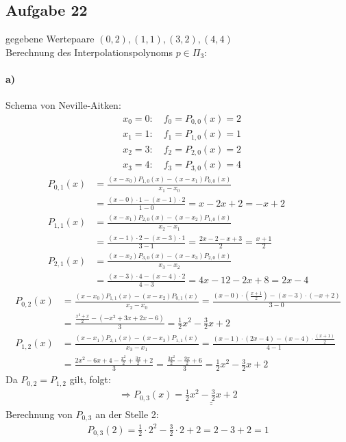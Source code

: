 \subsection*{Aufgabe 22}
gegebene Wertepaare $(0,2), (1,1), (3,2), (4,4)$\\
Berechnung des Interpolationspolynoms $p\in \Pi_3$:

\paragraph*{a)}
Schema von Neville-Aitken:
\begin{align*}
&x_0=0: \quad f_0=P_{0,0}(x)=2\\
&x_1=1: \quad f_1=P_{1,0}(x)=1\\
&x_2=3: \quad f_2=P_{2,0}(x)=2\\
&x_3=4: \quad f_3=P_{3,0}(x)=4
\end{align*}
\begin{align*}
P_{0,1}(x)&=\frac{(x-x_0)P_{1,0}(x)-(x-x_1)P_{0,0}(x)}{x_1-x_0}\\
  &=\frac{(x-0)\cdot 1 -(x-1)\cdot2}{1-0}= x-2x+2=-x+2\\
P_{1,1}(x)&=\frac{(x-x_1)P_{2,0}(x)-(x-x_2)P_{1,0}(x)}{x_2-x_1}\\
  &=\frac{(x-1)\cdot 2 -(x-3)\cdot 1}{3-1}= \frac{2x-2-x+3}{2}=\frac{x+1}{2}\\
P_{2,1}(x)&=\frac{(x-x_2)P_{3,0}(x)-(x-x_3)P_{2,0}(x)}{x_3-x_2}\\
  &=\frac{(x-3)\cdot 4 -(x-4)\cdot 2}{4-3}= 4x-12-2x+8=2x-4
\end{align*}
\begin{align*}
P_{0,2}(x)&=\frac{(x-x_0)P_{1,1}(x)-(x-x_2)P_{0,1}(x)}{x_2-x_0}=\frac{(x-0)\cdot (\frac{x+1}{2}) -(x-3) \cdot(-x+2)}{3-0}\\ &=\frac{\frac{x^2+x}{2}-(-x^2+3x+2x-6)}{3}=\frac{1}{2}x^2-\frac{3}{2}x+2\\
P_{1,2}(x)&=\frac{(x-x_1)P_{2,1}(x)-(x-x_3)P_{1,1}(x)}{x_3-x_1}=\frac{(x-1)\cdot (2x-4) -(x-4) \cdot\frac{(x+1)}{2}}{4-1}\\ &=\frac{2x^2-6x+4-\frac{x^2}{2}+\frac{3x}{2}+2}{3}=\frac{\frac{3x^2}{2}-\frac{9x}{2}+6}{3}=\frac{1}{2}x^2-\frac{3}{2}x+2
\end{align*}
Da $P_{0,2}=P_{1,2}$ gilt, folgt:
\begin{align*}
\Rightarrow P_{0,3}(x)=\underline{\underline{\frac{1}{2}x^2-\frac{3}{2}x+2}}
\end{align*}
Berechnung von $P_{0,3}$ an der Stelle 2:
\begin{align*}
P_{0,3}(2)=\frac{1}{2}\cdot 2^2-\frac{3}{2}\cdot 2+2=2-3+2=1
\end{align*}
